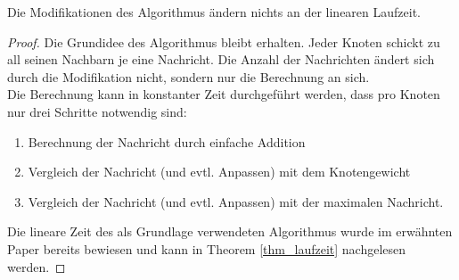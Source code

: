 	\begin{theorem}\label{thm_laufzeit_modifikation}
		Die Modifikationen des Algorithmus ändern nichts an der linearen Laufzeit.
	\end{theorem}
	\begin{proof}
		Die Grundidee des Algorithmus bleibt erhalten. Jeder Knoten schickt zu all seinen Nachbarn je eine Nachricht. Die Anzahl der Nachrichten ändert sich durch die Modifikation nicht, sondern nur die Berechnung an sich.\\Die Berechnung kann in konstanter Zeit durchgeführt werden, dass pro Knoten nur drei Schritte notwendig sind:
		\begin{enumerate}
			\item Berechnung der Nachricht durch einfache Addition
			\item Vergleich der Nachricht (und evtl. Anpassen) mit dem Knotengewicht
			\item Vergleich der Nachricht (und evtl. Anpassen) mit der maximalen Nachricht.
		\end{enumerate}
		Die lineare Zeit des als Grundlage verwendeten Algorithmus wurde im erwähnten Paper \cite{cima_paper} bereits bewiesen und kann in Theorem \ref{thm_laufzeit} nachgelesen werden.
	\end{proof}



